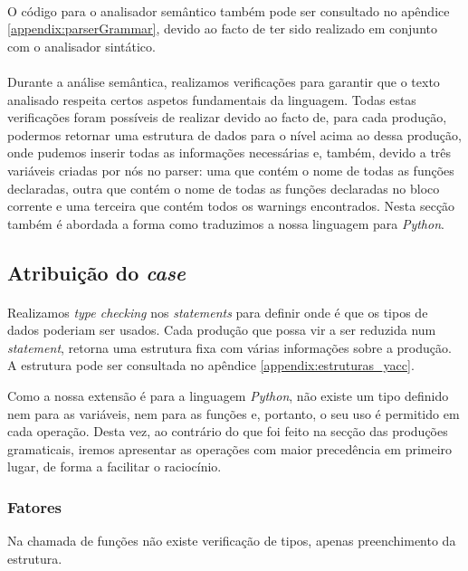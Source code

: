 \documentclass[11pt,a4paper]{report}
\makeatletter
\newcommand\subsubsubsection{\@startsection{paragraph}{4}{\z@}{-2.5ex\@plus -1ex \@minus -.25ex}{1.25ex \@plus .25ex}{\normalfont\normalsize\bfseries}}
\makeatother
\begin{document}
\paragraph*{}
O código para o analisador semântico também pode ser consultado no apêndice \ref{appendix:parserGrammar}, devido ao facto de ter sido realizado em conjunto com o analisador sintático.

\paragraph*{}
Durante a análise semântica, realizamos verificações para garantir que o texto analisado respeita certos aspetos fundamentais da linguagem. Todas estas verificações foram possíveis de realizar devido ao facto de, para cada produção, podermos retornar uma estrutura de dados para o nível acima ao dessa produção, onde pudemos inserir todas as informações necessárias e, também, devido a três variáveis criadas por nós no parser: uma que contém o nome de todas as funções declaradas, outra que contém  o nome de todas as funções declaradas no bloco corrente e uma terceira que contém todos os warnings encontrados. Nesta secção também é abordada a forma como traduzimos a nossa linguagem para \textit{Python}.

\subsection{Atribuição do \textit{case}}
\paragraph*{}
Realizamos \textit{type checking} nos \textit{statements} para definir onde é que os tipos de dados poderiam ser usados. Cada produção que possa vir a ser reduzida num \textit{statement}, retorna uma estrutura fixa com várias informações sobre a produção. A estrutura pode ser consultada no apêndice \ref{appendix:estruturas_yacc}.

Como a nossa extensão é para a linguagem \textit{Python}, não existe um tipo definido nem para as variáveis, nem para as funções e, portanto, o seu uso é permitido em cada operação. 
Desta vez, ao contrário do que foi feito na secção das produções gramaticais, iremos apresentar as operações com maior precedência em primeiro lugar, de forma a facilitar o raciocínio.

\subsubsection{Fatores}
\subsubsubsection{Chamadas de funções}
Na chamada de funções não existe verificação de tipos, apenas preenchimento da estrutura.
\end{document}
